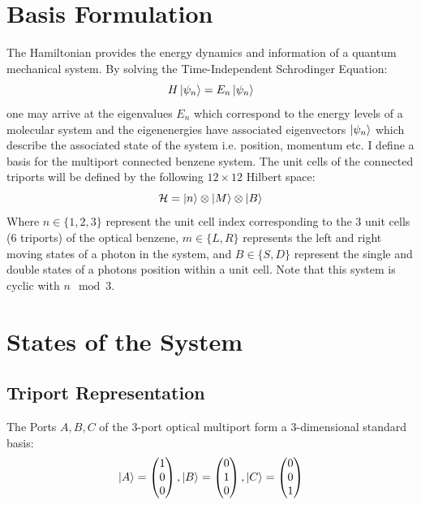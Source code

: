  \section{Basis Formulation}
 The Hamiltonian provides the energy dynamics and information of a quantum mechanical system. By solving the Time-Independent Schrodinger Equation:
 \begin{equation}
     H\ket{\psi_{n}} = E_{n} \ket{\psi_{n}}
 \end{equation}
 one may arrive at the eigenvalues $E_{n} $ which correspond to the energy levels of a molecular system and the eigenenergies have associated eigenvectors $\ket{\psi_{n}}$ which describe the associated state of the system i.e. position, momentum etc.  \newline
 I define a basis for the multiport connected benzene system. The unit cells of the connected triports will be defined by the following $12 \times 12$ Hilbert space:
 \begin{equation}
     \mathcal{H} = \ket{n} \otimes \ket{M} \otimes \ket{B}
 \end{equation}
 Where $n \in \{1,2,3\}$ represent the unit cell index corresponding to the 3 unit cells (6 triports) of the optical benzene, $m \in \{L, R\}$ represents the left and right moving states of a photon in the system, and $B \in \{S, D\}$ represent the single and double states of a photons position within a unit cell. Note that this system is cyclic with $n \mod 3$.
 \section{States of the System}
 \subsection{Triport Representation}
 The Ports $A, B, C$ of the $3$-port optical multiport form a $3$-dimensional standard basis:
 \begin{equation}
    \ket{A} = \begin{pmatrix}
    1 \\
    0 \\
    0 \end{pmatrix}
    ,
    \ket{B} = \begin{pmatrix}
    0 \\
    1 \\
    0 \end{pmatrix}
    ,
    \ket{C} = \begin{pmatrix}
    0 \\
    0 \\
    1 \end{pmatrix}
\end{equation}

